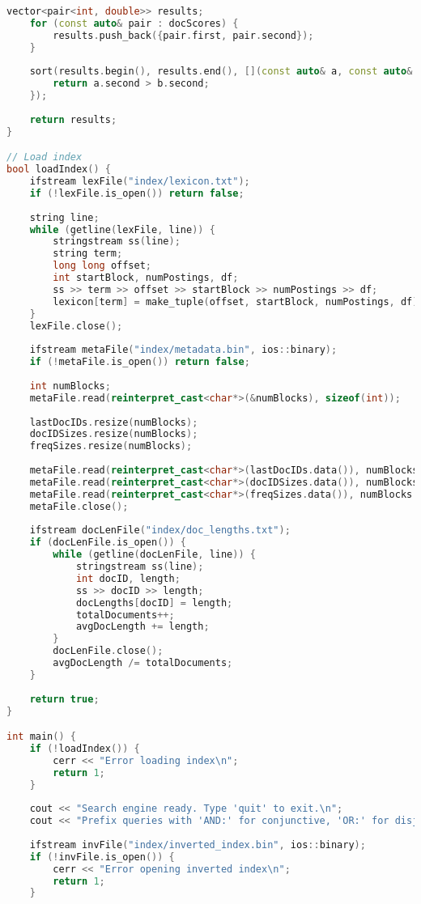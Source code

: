 \documentclass[11pt, a4paper]{report}
\begin{document}
\begin{lstlisting}[language=C++, caption={The complete source code for the query processor.}, label={lst:query}]
    vector<pair<int, double>> results;
    for (const auto& pair : docScores) {
        results.push_back({pair.first, pair.second});
    }
    
    sort(results.begin(), results.end(), [](const auto& a, const auto& b) {
        return a.second > b.second;
    });
    
    return results;
}

// Load index
bool loadIndex() {
    ifstream lexFile("index/lexicon.txt");
    if (!lexFile.is_open()) return false;
    
    string line;
    while (getline(lexFile, line)) {
        stringstream ss(line);
        string term;
        long long offset;
        int startBlock, numPostings, df;
        ss >> term >> offset >> startBlock >> numPostings >> df;
        lexicon[term] = make_tuple(offset, startBlock, numPostings, df);
    }
    lexFile.close();
    
    ifstream metaFile("index/metadata.bin", ios::binary);
    if (!metaFile.is_open()) return false;
    
    int numBlocks;
    metaFile.read(reinterpret_cast<char*>(&numBlocks), sizeof(int));
    
    lastDocIDs.resize(numBlocks);
    docIDSizes.resize(numBlocks);
    freqSizes.resize(numBlocks);
    
    metaFile.read(reinterpret_cast<char*>(lastDocIDs.data()), numBlocks * sizeof(int));
    metaFile.read(reinterpret_cast<char*>(docIDSizes.data()), numBlocks * sizeof(int));
    metaFile.read(reinterpret_cast<char*>(freqSizes.data()), numBlocks * sizeof(int));
    metaFile.close();
    
    ifstream docLenFile("index/doc_lengths.txt");
    if (docLenFile.is_open()) {
        while (getline(docLenFile, line)) {
            stringstream ss(line);
            int docID, length;
            ss >> docID >> length;
            docLengths[docID] = length;
            totalDocuments++;
            avgDocLength += length;
        }
        docLenFile.close();
        avgDocLength /= totalDocuments;
    }
    
    return true;
}

int main() {
    if (!loadIndex()) {
        cerr << "Error loading index\n";
        return 1;
    }
    
    cout << "Search engine ready. Type 'quit' to exit.\n";
    cout << "Prefix queries with 'AND:' for conjunctive, 'OR:' for disjunctive (default).\n\n";
    
    ifstream invFile("index/inverted_index.bin", ios::binary);
    if (!invFile.is_open()) {
        cerr << "Error opening inverted index\n";
        return 1;
    }
    

\end{lstlisting}
\end{document}
